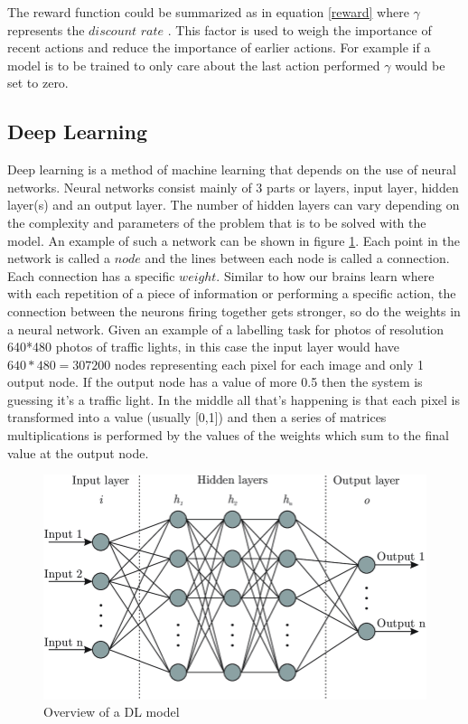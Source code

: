 \documentclass[conference]{IEEEtran}
\begin{document}
The reward function could be summarized as in equation \ref{reward} where $\gamma$ represents the $discount$ $rate$ . This factor is used to weigh the importance of recent actions and reduce the importance of earlier actions. For example if a model is to be trained to only care about the last action performed $\gamma$ would be set to zero.

\subsection{Deep Learning}

Deep learning is a method of machine learning that depends on the use of neural networks\cite{kelleher2019deep}. Neural networks consist mainly of 3 parts or layers, input layer, hidden layer(s) and an output layer. The number of hidden layers can vary depending on the complexity and parameters of the problem that is to be solved with the model. An example of such a network can be shown in figure \ref{fig:nn}. Each point in the network is called a $node$ and the lines between each node is called a connection. Each connection has a specific $weight$. Similar to how our brains learn where with each repetition of a piece of information or performing a specific action, the connection between the neurons firing together gets stronger, so do the weights in a neural network. Given an example of a labelling task for photos of resolution 640*480 photos of traffic lights, in this case the input layer would have $640*480=307200$ nodes representing each pixel for each image and only 1 output node. If the output node has a value of more 0.5 then the system is guessing it's a traffic light. In the middle all that's happening is that each pixel is transformed into a value (usually [0,1]) and then a series of matrices multiplications is performed by the values of the weights which sum to the final value at the output node.
\begin{figure}[h!]
	\centering
	\includegraphics[width=1\linewidth]{nn.png}
	\caption{Overview of a DL model\cite{article}}
	\label{fig:nn}
\end{figure}
\end{document}
